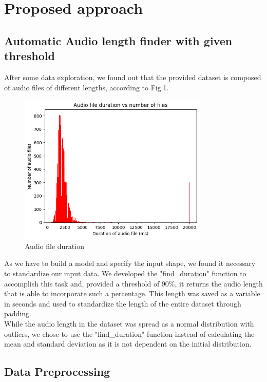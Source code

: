 \documentclass[conference]{IEEEtran}
\begin{document}
\vspace{5mm}

\section{Proposed approach}
\vspace{5mm}
\subsection{Automatic Audio length finder with given threshold}
After some data exploration, we found out that the provided dataset is composed of audio files of different lengths, according to Fig.1.

\begin{figure}[h]
\includegraphics[width=9cm]{audio_file_graph.png}
\caption{Audio file duration}
\label{fig1}
\end{figure}

As we have to build a model and specify the input shape, we found it necessary to standardize our input data. We developed the "find\_duration" function to accomplish this task and, provided a threshold of 90\%, it returns the audio length that is able to incorporate such a percentage. This length was saved as a variable in seconds and used to standardize the length of the entire dataset through padding.\\
While the audio length in the dataset was spread as a normal distribution with outliers, we chose to use the "find\_duration" function instead of calculating the mean and standard deviation as it is not dependent on the initial distribution.



\subsection{Data Preprocessing}
\end{document}
